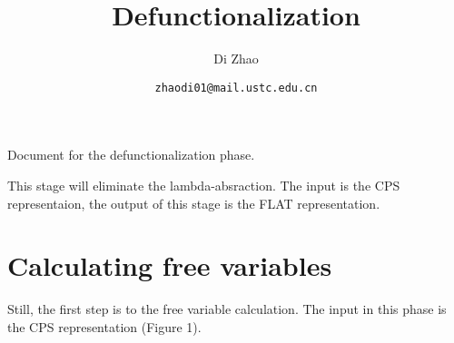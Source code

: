 \documentclass{article}
\theoremstyle{definition}
\theoremstyle{remark}
\numberwithin{equation}{section}
\begin{document}
\newcommand{\env}[1]{[\![#1]\!]\kappa}
\newcommand{\round}[1]{(\!|#1|\!)}

\title{Defunctionalization}%
\author{Di Zhao}%
\date{\small{\texttt{zhaodi01@mail.ustc.edu.cn}}}%

\maketitle

Document for the defunctionalization phase.

This stage will eliminate the
lambda-absraction. The input is the CPS representaion, the output of this
stage is the FLAT representation.

\section{Calculating free variables}

Still, the first step is to the free variable calculation.
The input in this phase is the CPS representation (Figure 1).
\end{document}
